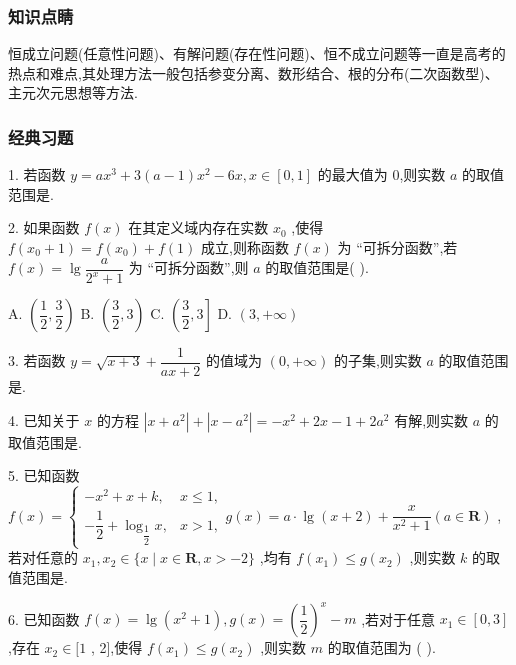 \subsubsection*{知识点睛}

恒成立问题(任意性问题)、有解问题(存在性问题)、恒不成立问题等一直是高考的热点和难点,其处理方法一般包括参变分离、数形结合、根的分布(二次函数型)、主元次元思想等方法.

\subsubsection*{经典习题}

1. 若函数 $y = a{x}^{3} + 3\left( {a - 1}\right) {x}^{2} - {6x},x \in  \left\lbrack  {0,1}\right\rbrack$ 的最大值为 0,则实数 $a$ 的取值范围是\blkda{}.

2. 如果函数 $f\left( x\right)$ 在其定义域内存在实数 ${x}_{0}$ ,使得 $f\left( {{x}_{0} + 1}\right)  = f\left( {x}_{0}\right)  + f\left( 1\right)$ 成立,则称函数 $f\left( x\right)$ 为 “可拆分函数”,若 $f\left( x\right)  = \lg \dfrac{a}{{2}^{x} + 1}$ 为 “可拆分函数”,则 $a$ 的取值范围是(   ).

A. $\left( {\dfrac{1}{2},\dfrac{3}{2}}\right)$ B. $\left( {\dfrac{3}{2},3}\right)$ C. $\left( {\dfrac{3}{2},3}\right\rbrack$ D. $\left( {3, + \infty }\right)$

3. 若函数 $y = \sqrt{x + 3} + \dfrac{1}{{ax} + 2}$ 的值域为 $\left( {0, + \infty }\right)$ 的子集,则实数 $a$ 的取值范围是\blkda{}.

4. 已知关于 $x$ 的方程 $\left| {x + {a}^{2}}\right|  + \left| {x - {a}^{2}}\right|  =  - {x}^{2} + {2x} - 1 + 2{a}^{2}$ 有解,则实数 $a$ 的取值范围是\blkda{}.

5. 已知函数 $f\left( x\right)  = \left\{  {\begin{array}{ll}  - {x}^{2} + x + k, & x \leq  1, \\   - \dfrac{1}{2} + {\log }_{\dfrac{1}{2}}x, & x > 1, \end{array}g\left( x\right)  = a \cdot  \lg \left( {x + 2}\right)  + \dfrac{x}{{x}^{2} + 1}\left( {a \in  \mathbf{R}}\right) }\right.$ ,若对任意的 ${x}_{1},{x}_{2} \in  \{ x \mid  x \in  \mathbf{R},x >  - 2\}$ ,均有 $f\left( {x}_{1}\right)  \leq  g\left( {x}_{2}\right)$ ,则实数 $k$ 的取值范围是\blkda{}.

6. 已知函数 $f\left( x\right)  = \lg \left( {{x}^{2} + 1}\right) ,g\left( x\right)  = {\left( \dfrac{1}{2}\right) }^{x} - m$ ,若对于任意 ${x}_{1} \in  \left\lbrack  {0,3}\right\rbrack$ ,存在 ${x}_{2} \in  \lbrack 1$ , 2],使得 $f\left( {x}_{1}\right)  \leq  g\left( {x}_{2}\right)$ ,则实数 $m$ 的取值范围为 (   ).

